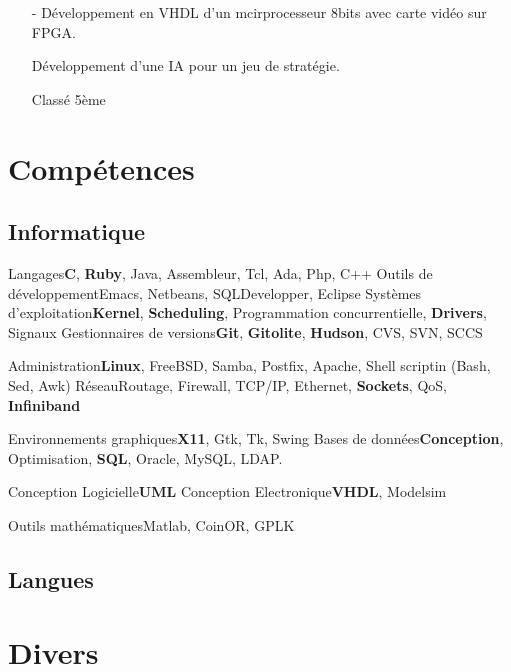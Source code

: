 \documentclass[10pt,a4paper]{moderncv}
\begin{document}
{
\begin{itemize}
\item[-]{D\'{e}veloppement en VHDL d'un mcirprocesseur 8bits avec carte vid\'{e}o sur FPGA.}
\end{itemize}
}

{
\begin{itemize}
\item[]{D\'{e}veloppement d'une IA pour un jeu de strat\'{e}gie.}
\item[]{Class\'{e} 5\`{e}me}
\end{itemize}
}

\section{Comp\'{e}tences}
\subsection{Informatique}
\cvcomputer
{Langages}{\textbf{C}, \textbf{Ruby}, Java, Assembleur, Tcl, Ada, Php, C++}
{Outils de d\'{e}veloppement}{Emacs, Netbeans, SQLDevelopper, Eclipse}
\cvcomputer
{Syst\`{e}mes d'exploitation}{\textbf{Kernel}, \textbf{Scheduling}, Programmation concurrentielle, \textbf{Drivers}, Signaux}
{Gestionnaires de versions}{\textbf{Git}, \textbf{Gitolite}, \textbf{Hudson}, CVS, SVN, SCCS}


\cvcomputer
{Administration}{\textbf{Linux}, FreeBSD, Samba, Postfix, Apache, Shell scriptin (Bash, Sed, Awk)}
{R\'{e}seau}{Routage, Firewall, TCP/IP, Ethernet, \textbf{Sockets}, QoS, \textbf{Infiniband}}

\cvcomputer
{Environnements graphiques}{\textbf{X11}, Gtk, Tk, Swing}
{Bases de donn\'{e}es}{\textbf{Conception}, Optimisation, \textbf{SQL}, Oracle, MySQL, LDAP.}

\cvcomputer
{Conception Logicielle}{\textbf{UML}}
{Conception Electronique}{\textbf{VHDL}, Modelsim}

\cvcomputer
{Outils math\'{e}matiques}{Matlab, CoinOR, GPLK}{}{}

\subsection{Langues}

\section{Divers}
\end{document}
